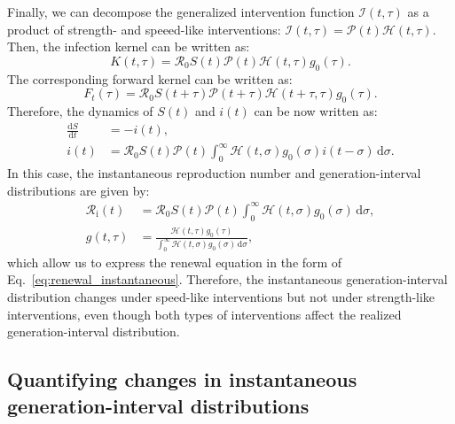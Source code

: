 \documentclass[12pt]{article}
\newcommand{\eref}[1]{Eq.~\ref{eq:#1}}
\newcommand{\Rx}[1]{\ensuremath{{\mathcal R}_{#1}}\xspace}
\newcommand{\Ro}{\Rx{0}}
\newcommand{\Ri}{\Rx{\mathrm{i}}}
\newcommand{\RR}{\ensuremath{{\mathcal R}}\xspace}
\newcommand{\dd}[1]{\ensuremath{\, \mathrm{d}#1}}
\newcommand{\dsigma}{\dd{\sigma}}
\newcommand{\PP}{{\mathcal P}}
\newcommand{\II}{\ensuremath{\mathcal I}}
\newcommand{\HH}{\ensuremath{\mathcal H}}
\begin{document}
Finally, we can decompose the generalized intervention function $\II(t, \tau)$ as a product of strength- and speeed-like interventions: $\II(t, \tau) = \PP(t) \HH(t, \tau)$. Then, the infection kernel can be written as:
\begin{equation}
K(t, \tau) = \Ro S(t) \PP(t) \HH(t,\tau) g_0(\tau).
\end{equation}
The corresponding forward kernel can be written as:
\begin{equation}
F_t(\tau) = \Ro S(t+\tau) \PP(t + \tau) \HH(t+\tau, \tau) g_0(\tau).
\end{equation}
Therefore, the dynamics of $S(t)$ and $i(t)$ can be now written as:
\begin{align}
\frac{\mathrm{d}S}{\mathrm{d}t} &= - i(t),\\
i(t) &= \Ro S(t) \PP(t) \int_0^\infty \HH(t, \sigma) g_0(\sigma) i(t-\sigma)\dsigma.
\end{align}
In this case, the instantaneous reproduction number and generation-interval distributions are given by:
\begin{align}
\Ri(t) &= \RR_0 S(t) \PP(t) \int_0^\infty \HH(t,\sigma) g_0(\sigma) \dsigma,\\
g(t, \tau) &= \frac{\HH(t,\tau) g_0(\tau)}{\int_0^\infty \HH(t,\sigma) g_0(\sigma) \dsigma},
\end{align}
which allow us to express the renewal equation in the form of \eref{renewal_instantaneous}.
Therefore, the instantaneous generation-interval distribution changes under speed-like interventions but not under strength-like interventions, even though both types of interventions affect the realized generation-interval distribution.

\subsection{Quantifying changes in instantaneous generation-interval distributions}
\end{document}

